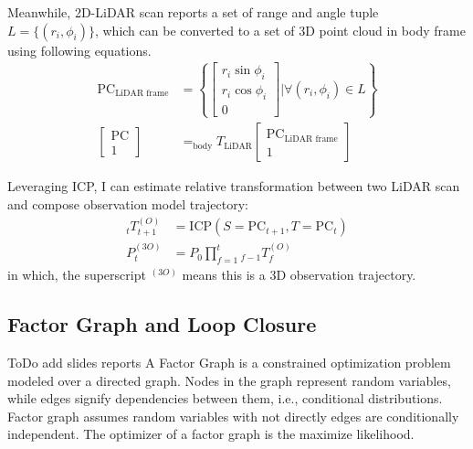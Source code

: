 \documentclass[conference]{IEEEtran}
\begin{document}
Meanwhile, 2D-LiDAR scan reports a set of range and angle tuple $L = \{(r_i, \phi_i)\}$,
which can be converted to a set of 3D point cloud in body frame using following equations.
$$
\begin{aligned}
    \mathrm{PC}_{\text{LiDAR frame}} 
        &= \left\{ \left[ \begin{gathered}r_i\sin \phi_i \\ r_i\cos \phi_i \\ 0\end{gathered} \right] \bigg| \forall (r_i, \phi_i)\in L\right\} 
        \\
    \left[ \begin{gathered} \mathrm{PC} \\ 1\end{gathered} \right]  
    &= _{\text{body}}T_{\text{LiDAR}}  \left[ \begin{gathered} \mathrm{PC}_{\text{LiDAR frame}}  \\ 1\end{gathered} \right]  
\end{aligned}
$$

Leveraging ICP, I can estimate relative transformation between two LiDAR scan and
compose observation model trajectory:
$$
\begin{aligned}
    _{t}T^{(O)}_{t+1}
        &=\text{ICP}(S=\mathrm{PC}_{t+1}, T=\mathrm{PC}_{t}) \\ 
    P^{(3O)}_{t}
        &=P_{0}\prod^{t}_{f=1} {}_{f-1} T^{(O)}_{f}
\end{aligned} 
$$
in which, the superscript $^{(3O)}$ means this is a 3D observation trajectory.

\subsection{Factor Graph and Loop Closure}
ToDo add slides reports
A Factor Graph is a constrained optimization problem modeled over a directed graph. 
Nodes in the graph represent random variables, 
while edges signify dependencies between them, i.e., conditional distributions. 
Factor graph assumes random variables with not directly edges are conditionally independent. 
The optimizer of a factor graph is the maximize likelihood.
\end{document}
